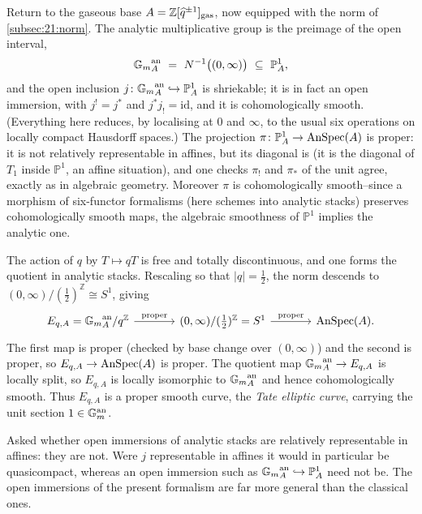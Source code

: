 Return to the gaseous base $A=\mathbb Z[\widehat q^{\pm1}]_{\mathrm{gas}}$, now equipped
with the norm of \cref{subsec:21:norm}. The analytic multiplicative group is the
preimage of the open interval,
\begin{equation*}
{\Gm}^{\mathrm{an}}_A\ =\ N^{-1}\bigl((0,\infty)\bigr)\ \subseteq\ \mathbb P^1_A ,
\end{equation*}
and the open inclusion $j\colon{\mathbb{G}_{m}}^{\mathrm{an}}_A\hookrightarrow\mathbb P^1_A$ is
shriekable; it is in fact an open immersion, with $j^{!}=j^{*}$ and
$j^{*}j_{!}=\mathrm{id}$, and it is cohomologically smooth. (Everything here
reduces, by localising at $0$ and $\infty$, to the usual six operations on
locally compact Hausdorff spaces.) The projection
$\pi\colon\mathbb P^1_A\to\operatorname{AnSpec}(A)$ is proper: it is not relatively
representable in affines, but its diagonal is (it is the diagonal of $T_1$ inside
$\mathbb P^1$, an affine situation), and one checks $\pi_!$ and $\pi_*$ of the
unit agree, exactly as in algebraic geometry. Moreover $\pi$ is cohomologically
smooth--since a morphism of six-functor formalisms (here schemes into analytic
stacks) preserves cohomologically smooth maps, the algebraic smoothness of
$\mathbb P^1$ implies the analytic one.

The action of $q$ by $T\mapsto qT$ is free and totally discontinuous, and one
forms the quotient in analytic stacks. Rescaling so that $|q|=\tfrac12$, the norm
descends to $(0,\infty)/(\tfrac12)^{\mathbb Z}\cong S^1$, giving
\begin{equation*}
\begin{tikzcd}[column sep=large]
E_{q,A}={\Gm}^{\mathrm{an}}_A/q^{\mathbb Z}
\arrow[r, "\text{proper}"] &
(0,\infty)/(\tfrac12)^{\mathbb Z}=S^1
\arrow[r, "\text{proper}"] &
\AnSpec(A).
\end{tikzcd}
\end{equation*}
The first map is proper (checked by base change over $(0,\infty)$) and the second
is proper, so $E_{q,A}\to\operatorname{AnSpec}(A)$ is proper. The quotient map
${\mathbb{G}_{m}}^{\mathrm{an}}_A\to E_{q,A}$ is locally split, so $E_{q,A}$ is locally
isomorphic to ${\mathbb{G}_{m}}^{\mathrm{an}}_A$ and hence cohomologically smooth. Thus
$E_{q,A}$ is a proper smooth curve, the \emph{Tate elliptic curve}, carrying the
unit section $1\in\mathbb{G}_{m}^{\mathrm{an}}$.

\begin{remark}
\label{rmk:21:open-not-representable}
Asked whether open immersions of analytic stacks are relatively representable in
affines: they are not. Were $j$ representable in affines it would in particular be
quasicompact, whereas an open immersion such as
${\mathbb{G}_{m}}^{\mathrm{an}}_A\hookrightarrow\mathbb P^1_A$ need not be. The open
immersions of the present formalism are far more general than the classical ones.
\end{remark}

